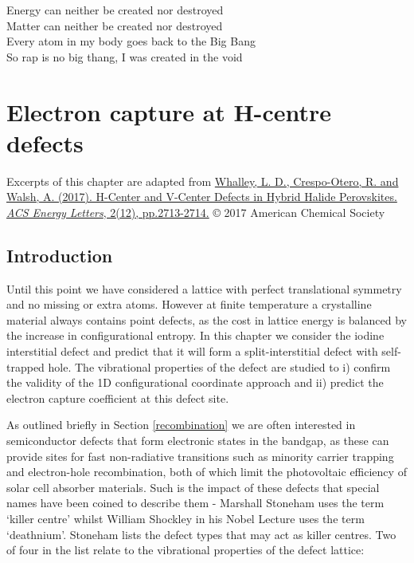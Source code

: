 \begin{savequote}[8cm]
Energy can neither be created nor destroyed \\
Matter can neither be created nor destroyed \\
Every atom in my body goes back to the Big Bang \\
So rap is no big thang, I was created in the void
\end{savequote}

\chapter{\label{ch:6-defects}Electron capture at H-centre defects}

Excerpts of this chapter are adapted from
\href{https://doi.org/10.1021/acsenergylett.7b00995}{Whalley, L. D., Crespo-Otero, R. and Walsh, A. (2017). H-Center and V-Center Defects in Hybrid Halide Perovskites. \textit{ACS Energy Letters}, 2(12), pp.2713-2714.} © 2017 American Chemical Society 


\section{Introduction}

Until this point we have considered a lattice with perfect translational symmetry and no missing or extra atoms. However at finite temperature a crystalline material always contains point defects, as the cost in lattice energy is balanced by the increase in configurational entropy.
In this chapter we consider the iodine interstitial defect and predict that it will form a split-interstitial defect with self-trapped hole. The vibrational properties of the defect are studied to i) confirm the validity of the 1D configurational coordinate approach and ii) predict the electron capture coefficient at this defect site.

As outlined briefly in Section \ref{recombination} we are often interested in semiconductor defects that form electronic states in the bandgap, as these can provide sites for fast non-radiative transitions such as minority carrier trapping and electron-hole recombination, both of which limit the photovoltaic efficiency of solar cell absorber materials. Such is the impact of these defects that special names have been coined to describe them - Marshall Stoneham uses the term `killer centre'\autocite{Hayes1985} whilst William Shockley in his Nobel Lecture uses the term `deathnium'.\autocite{shockley}
Stoneham lists the defect types that may act as killer centres. Two of four in the list relate to the vibrational properties of the defect lattice:

